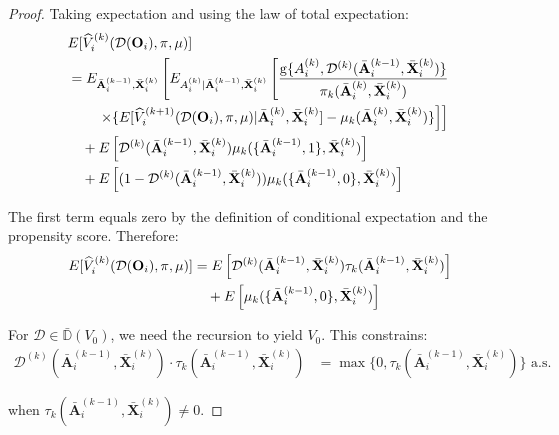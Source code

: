 \documentclass[11pt]{article}
\theoremstyle{referenceplain}
\theoremstyle{referencedefinition}
\theoremstyle{referenceremark}
\begin{document}
\begin{proof}
Taking expectation and using the law of total expectation:
\begin{align}
    &E[\widehat{V}_i^{(k)}(\mathcal{D}(\mathbf{O}_i),\pi,\mu)]\notag\\
    &= E_{\bar{\mathbf{A}}_i^{(k-1)},\bar{\mathbf{X}}_i^{(k)}}\left[E_{A_i^{(k)}|\bar{\mathbf{A}}_i^{(k-1)},\bar{\mathbf{X}}_i^{(k)}}\left[\frac{\mathrm{g}\{A_i^{(k)}, \mathcal{D}^{(k)}(\bar{\mathbf{A}}_i^{(k-1)},\bar{\mathbf{X}}_i^{(k)})\}}{\pi_k(\bar{\mathbf{A}}_i^{(k)}, \bar{\mathbf{X}}_i^{(k)})}\right.\right.\notag\\
    &\quad\quad\left.\left.\times \{E[\widehat{V}_i^{(k+1)}(\mathcal{D}(\mathbf{O}_i),\pi,\mu)|\bar{\mathbf{A}}_i^{(k)}, \bar{\mathbf{X}}_i^{(k)}] - \mu_k(\bar{\mathbf{A}}_i^{(k)}, \bar{\mathbf{X}}_i^{(k)})\}\right]\right]\notag\\
    &\quad + E\left[\mathcal{D}^{(k)}(\bar{\mathbf{A}}_i^{(k-1)},\bar{\mathbf{X}}_i^{(k)}) \mu_k(\{\bar{\mathbf{A}}_i^{(k-1)},1\}, \bar{\mathbf{X}}_i^{(k)})\right]\notag\\
    &\quad + E\left[(1-\mathcal{D}^{(k)}(\bar{\mathbf{A}}_i^{(k-1)},\bar{\mathbf{X}}_i^{(k)})) \mu_k(\{\bar{\mathbf{A}}_i^{(k-1)},0\}, \bar{\mathbf{X}}_i^{(k)})\right]
\end{align}

The first term equals zero by the definition of conditional expectation and the propensity score. Therefore:
\begin{align}
    E[\widehat{V}_i^{(k)}(\mathcal{D}(\mathbf{O}_i),\pi,\mu)] &= E\left[\mathcal{D}^{(k)}(\bar{\mathbf{A}}_i^{(k-1)},\bar{\mathbf{X}}_i^{(k)}) \tau_k(\bar{\mathbf{A}}_i^{(k-1)},\bar{\mathbf{X}}_i^{(k)})\right]\notag\\
    &\quad + E\left[\mu_k(\{\bar{\mathbf{A}}_i^{(k-1)},0\}, \bar{\mathbf{X}}_i^{(k)})\right]\label{multi-constraint-1}
\end{align}

For $\mathcal{D} \in \bar{\mathbb{D}}(V_0)$, we need the recursion to yield $V_0$. This constrains:
\begin{align}
    \mathcal{D}^{(k)}(\bar{\mathbf{A}}_i^{(k-1)},\bar{\mathbf{X}}_i^{(k)}) \cdot \tau_k(\bar{\mathbf{A}}_i^{(k-1)},\bar{\mathbf{X}}_i^{(k)}) &= \max\{0, \tau_k(\bar{\mathbf{A}}_i^{(k-1)},\bar{\mathbf{X}}_i^{(k)})\} \text{ a.s.}\label{multi-constraint-2}
\end{align}

when $\tau_k(\bar{\mathbf{A}}_i^{(k-1)},\bar{\mathbf{X}}_i^{(k)}) \neq 0$.

 

\end{proof}
\end{document}
